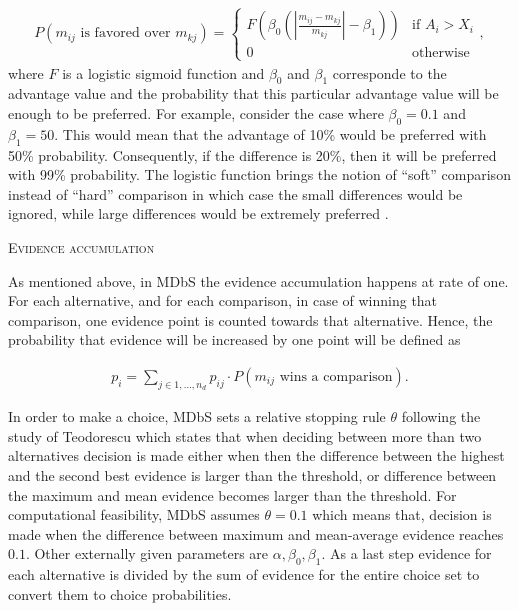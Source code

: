 \documentclass[a4paper,12pt]{article}
\newcommand{\citeyearonly}[1]{\citeyearpar{#1}}
\begin{document}
\begin{align}\label{probabilityOneIsFavored}
    P(m_{ij} \text{ is favored over } m_{kj}) = 
        \begin{cases}
        F(\beta_0 (| \frac{m_{ij} - m_{kj}}{m_{kj}} |- \beta_1)) & \text{if } A_i > X_i \\
        0 & \text{otherwise}
        \end{cases} ,
\end{align}
where $F$ is a logistic sigmoid function and $\beta_0$ and $\beta_1$ corresponde to the advantage value and the probability that this particular advantage value will be enough to be preferred. For example, consider the case where $\beta_0 = 0.1$ and $\beta_1 = 50$. This would mean that the advantage of 10\% would be preferred with 50\% probability. Consequently, if the difference is 20\%, then it will be preferred with 99\% probability. The logistic function brings the notion of ``soft'' comparison instead of ``hard'' comparison in which case the small differences would be ignored, while large differences would be extremely preferred \citep{noguchi2018multialternative}.

\textsc{Evidence accumulation}

As mentioned above, in MDbS the evidence accumulation happens at rate of one. For each alternative, and for each comparison, in case of winning that comparison, one evidence point is counted towards that alternative. Hence, the probability that evidence will be increased by one point will be defined as 

\begin{align}\label{probabilityOfEvidenceIncreasing}
    p_i = \sum_{j \in {1, \ldots, n_d}} p_{ij} \cdot P(m_{ij} \text{ wins a comparison}).
\end{align}

In order to make a choice, MDbS sets a relative stopping rule $\theta$ following the study of Teodorescu \citeyearonly{teodorescu2013disentangling} which states that when deciding between more than two alternatives decision is made either when then the difference between the highest and the second best evidence is larger than the threshold, or difference between the maximum and mean evidence becomes larger than the threshold. For computational feasibility, MDbS assumes $\theta = 0.1$ which means that, decision is made when the difference between maximum and mean-average evidence reaches $0.1$. Other externally given parameters are $\alpha, \beta_0, \beta_1$. As a last step evidence for each alternative is divided by the sum of evidence for the entire choice set to convert them to choice probabilities.
\end{document}
